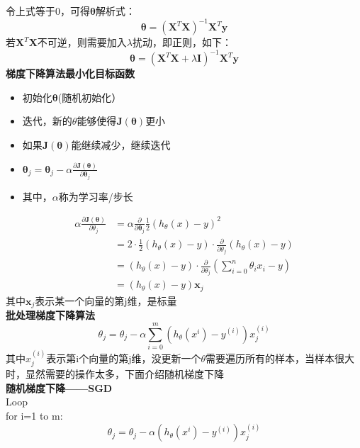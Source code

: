 \documentclass{ctexart}
\begin{document}
    令上式等于0，可得$\bm\theta$解析式：
    \begin{equation}\label{eq:jiexijie}
      \bm\theta = (\bm X^T\bm X)^{-1}\bm X^T\bm y
    \end{equation}
    若$\bm X^T\bm X$不可逆，则需要加入$\lambda $扰动，即正则，如下：
    \begin{equation}
      \bm\theta = (\bm X^T\bm X + \lambda\bm I)^{-1}\bm X^T\bm y
    \end{equation}
    \textbf{梯度下降算法最小化目标函数}
    \begin{itemize}
      \item 初始化$\bm\theta$(随机初始化）
      \item 迭代，新的$\theta$能够使得$\bm J(\bm\theta)$更小
      \item 如果$\bm J(\bm\theta)$能继续减少，继续迭代
      \item $\bm\theta_j = \bm\theta_j-\alpha \frac{\partial \bm J(\bm\theta)}{\partial\bm\theta_j}$
      \item 其中，$\alpha$称为学习率/步长
    \end{itemize}
    \begin{align}\label{gredient}
      \alpha \frac{\partial \bm J(\bm\theta)}{\partial\theta_j} & = \alpha \frac{\partial }{\partial\bm\theta_j}\frac{1}{2}\left (h_\theta(x)-y \right )^2\\
       & = 2\cdot\frac{1}{2}\left (h_\theta(x)-y \right )\cdot\frac{\partial}{\partial\theta_j} \left (h_\theta(x)-y \right )\\
       & = \left (h_\theta(x)-y \right )\cdot\frac{\partial}{\partial\theta_j}(\sum_{i=0}^{n}\theta_ix_i-y) \\
       & = \left (h_\theta(x)-y \right )\bm x_j
    \end{align}
    其中$\bm x_j$表示某一个向量的第j维，是标量 \\
    \textbf{批处理梯度下降算法}
    \begin{equation}\label{bath_gradient}
      \theta_j = \theta_j-\alpha\sum_{i=0}^{m}(h_\theta(x^{i})- y^{(i)})x_{j}^{(i)}
    \end{equation}
    其中$x_{j}^{(i)}$表示第i个向量的第j维，没更新一个$\theta$需要遍历所有的样本，当样本很大时，显然需要的操作太多，下面介绍随机梯度下降 \\
    \textbf{随机梯度下降——SGD}\\
     Loop \\
      for i=1 to m:
    \begin{equation}\label{SGD}
             \theta_j = \theta_j-\alpha(h_\theta(x^{i})- y^{(i)})x_{j}^{(i)}
    \end{equation}
\end{document}
